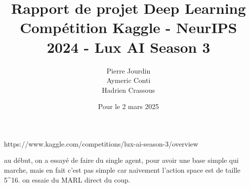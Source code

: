 \documentclass[12pt,a4paper]{article}
\title{Rapport de projet Deep Learning
\\ \large Compétition Kaggle - NeurIPS 2024 - Lux AI Season 3
}
\author{Pierre Jourdin \\ Aymeric Conti \\ Hadrien Crassous}
\date{Pour le 2 mars 2025}
\begin{document}
\maketitle

\tableofcontents

https://www.kaggle.com/competitions/lux-ai-season-3/overview

au début, on a essayé de faire du single agent, pour avoir une base simple qui marche, mais en fait c'est pas simple car naivement l'action space est de taille 5^16.
on essaie du MARL direct du coup.
\end{document}

